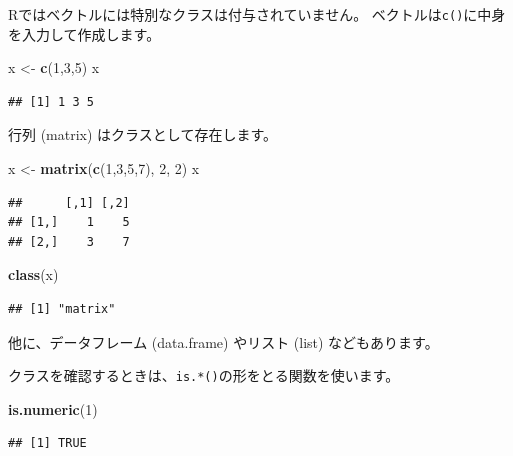 \documentclass[]{bxjsreport}
\newenvironment{Shaded}{\begin{snugshade}}{\end{snugshade}}
\newcommand{\DecValTok}[1]{\textcolor[rgb]{0.00,0.00,0.81}{#1}}
\newcommand{\KeywordTok}[1]{\textcolor[rgb]{0.13,0.29,0.53}{\textbf{#1}}}
\newcommand{\NormalTok}[1]{#1}
\newcommand{\StringTok}[1]{\textcolor[rgb]{0.31,0.60,0.02}{#1}}
\begin{document}
Rではベクトルには特別なクラスは付与されていません。
ベクトルは\texttt{c()}に中身を入力して作成します。

\begin{Shaded}
\begin{Highlighting}[]
\NormalTok{x <-}\StringTok{ }\KeywordTok{c}\NormalTok{(}\DecValTok{1}\NormalTok{,}\DecValTok{3}\NormalTok{,}\DecValTok{5}\NormalTok{)}
\NormalTok{x}
\end{Highlighting}
\end{Shaded}

\begin{verbatim}
## [1] 1 3 5
\end{verbatim}

行列 (matrix) はクラスとして存在します。

\begin{Shaded}
\begin{Highlighting}[]
\NormalTok{x <-}\StringTok{ }\KeywordTok{matrix}\NormalTok{(}\KeywordTok{c}\NormalTok{(}\DecValTok{1}\NormalTok{,}\DecValTok{3}\NormalTok{,}\DecValTok{5}\NormalTok{,}\DecValTok{7}\NormalTok{), }\DecValTok{2}\NormalTok{, }\DecValTok{2}\NormalTok{)}
\NormalTok{x}
\end{Highlighting}
\end{Shaded}

\begin{verbatim}
##      [,1] [,2]
## [1,]    1    5
## [2,]    3    7
\end{verbatim}

\begin{Shaded}
\begin{Highlighting}[]
\KeywordTok{class}\NormalTok{(x)}
\end{Highlighting}
\end{Shaded}

\begin{verbatim}
## [1] "matrix"
\end{verbatim}

他に、データフレーム (data.frame) やリスト (list) などもあります。

クラスを確認するときは、\texttt{is.*()}の形をとる関数を使います。

\begin{Shaded}
\begin{Highlighting}[]
\KeywordTok{is.numeric}\NormalTok{(}\DecValTok{1}\NormalTok{)}
\end{Highlighting}
\end{Shaded}

\begin{verbatim}
## [1] TRUE
\end{verbatim}
\end{document}
